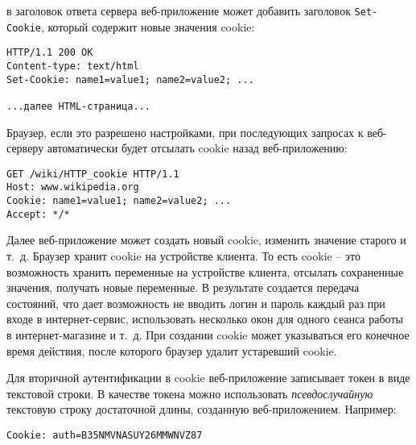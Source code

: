 в заголовок ответа сервера веб-приложение может добавить заголовок \texttt{Set-Cookie}, который содержит новые значения cookie:
\begin{center} \begin{verbatim}
HTTP/1.1 200 OK
Content-type: text/html
Set-Cookie: name1=value1; name2=value2; ...

...далее HTML-страница...
\end{verbatim} \end{center}

Браузер, если это разрешено настройками, при последующих запросах к веб-серверу автоматически будет отсылать cookie назад веб-приложению:
\begin{center} \begin{verbatim}
GET /wiki/HTTP_cookie HTTP/1.1
Host: www.wikipedia.org
Cookie: name1=value1; name2=value2; ...
Accept: */*
\end{verbatim} \end{center}

Далее веб-приложение может создать новый cookie, изменить значение старого и т.~д. Браузер хранит cookie на устройстве клиента. То есть cookie -- это возможность хранить переменные на устройстве клиента, отсылать сохраненные значения, получать новые переменные. В результате создается передача состояний, что дает возможность не вводить логин и пароль каждый раз при входе в интернет-сервис, использовать несколько окон для одного сеанса работы в интернет-магазине и т.~д. При создании cookie может указываться его конечное время действия, после которого браузер удалит устаревший cookie.

Для вторичной аутентификации в cookie веб-приложение записывает токен в виде текстовой строки. В качестве токена можно использовать \emph{псевдослучайную} текстовую строку достаточной длины, созданную веб-приложением. Например:
\begin{center} \begin{verbatim}
Cookie: auth=B35NMVNASUY26MMWNVZ87
\end{verbatim} \end{center}

